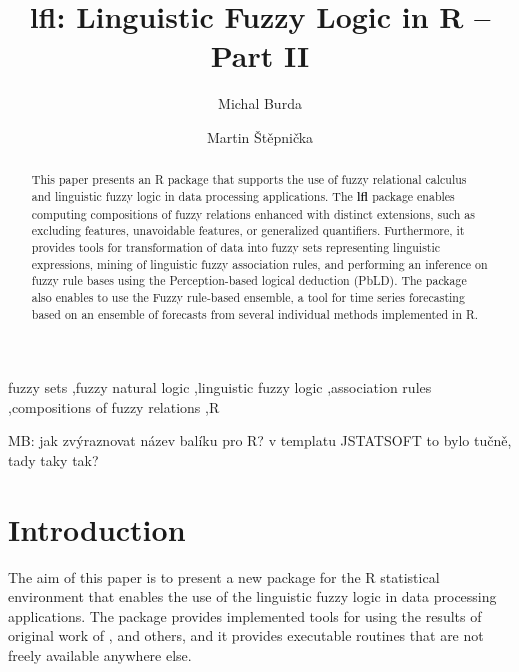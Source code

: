 \documentclass[review]{elsarticle}
\newcommand{\pkg}[1]{\textbf{#1}}
\newcommand{\proglang}[1]{#1}
\newcommand{\R}{\proglang{R}}
\newcommand{\michal}[1]{{\color{green} MB: #1}}
\begin{document}
\begin{frontmatter}

\title{lfl: Linguistic Fuzzy Logic in \R{} -- Part II}

\author{Michal Burda}
\author{Martin \v{S}t\v{e}pni\v{c}ka}
\address{Institute for Research and Applications of Fuzzy Modeling, University of Ostrava, CE~IT4Innovations, 30.~dubna 22, 701 03 Ostrava, Czech Republic}


\begin{abstract}
This paper presents an \R{} package that supports the use of fuzzy relational calculus and linguistic fuzzy logic in data processing applications. The \pkg{lfl} package enables computing compositions of fuzzy relations enhanced with distinct extensions, such as excluding features, unavoidable features, or generalized quantifiers. Furthermore, it provides tools for transformation of data into fuzzy sets representing linguistic expressions, mining of linguistic fuzzy association rules, and performing an inference on fuzzy rule bases using the Perception-based logical deduction (PbLD). The package also enables to use the Fuzzy rule-based ensemble, a tool for time series forecasting based on an ensemble of forecasts from several individual methods implemented in \R{}.
\end{abstract}

\begin{keyword}
fuzzy sets \sep fuzzy natural logic \sep linguistic fuzzy logic \sep association rules \sep compositions of fuzzy relations \sep\R{}
\end{keyword}

\end{frontmatter}

\linenumbers

\michal{jak zvýraznovat název balíku pro R? v templatu JSTATSOFT to bylo tučně, tady taky tak?}



\section{Introduction} \label{sec:intro}


The aim of this paper is to present a new package for the \R{} statistical environment
\citep{R2020} that enables the use of the linguistic fuzzy logic in data processing
applications. The package provides implemented tools for using the results of original work of
\cite{Novak08, Novak:PbLD, DvoStep:PbLD2015, StepBurda:FRBE_FSS}, and others, and it provides
executable routines that are not freely available anywhere else.
\end{document}
